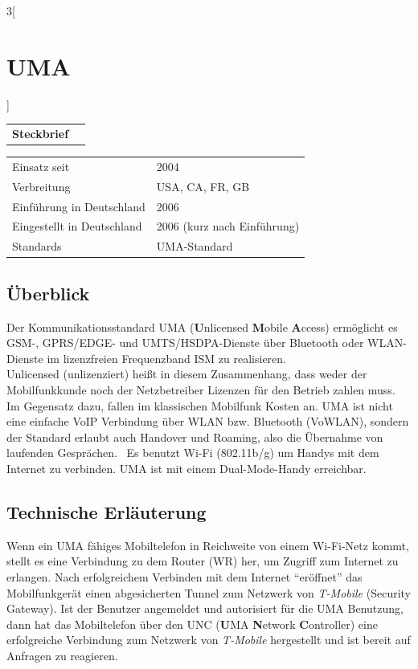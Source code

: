 \begin{multicols}{3}[\section{UMA}]


\newrefsegment

\begin{tabular}{p{}p{2.7 cm}}
\textbf{Steckbrief}& \\
\end{tabular}

\begin{tabular}{p{}p{2.7 cm}}
\rowcolors{1}{\topicolor!20}{}
      Einsatz seit & 2004\\
      Verbreitung & USA, CA, FR, GB\\
	  Einführung in Deutschland & 2006\\
      Eingestellt in Deutschland & 2006 (kurz nach Einführung)\\
	  Standards & UMA-Standard\\
\end{tabular}
\par
\subsection*{Überblick}
Der Kommunikationsstandard UMA (\textbf{U}nlicensed \textbf{M}obile \textbf{A}ccess) ermöglicht es GSM-, GPRS/EDGE- und UMTS/HSDPA-Dienste über Bluetooth oder WLAN-Dienste im lizenzfreien Frequenzband ISM zu realisieren.\\	
Unlicensed (unlizenziert) heißt in diesem Zusammenhang, dass weder der Mobilfunkkunde noch der Netzbetreiber Lizenzen für den Betrieb zahlen muss. Im Gegensatz dazu, fallen im klassischen Mobilfunk Kosten an. UMA ist nicht eine einfache VoIP Verbindung über WLAN bzw. Bluetooth (VoWLAN), sondern der Standard erlaubt auch Handover und Roaming, also die Übernahme von laufenden Gesprächen.~\cite{uma.3}
Es benutzt Wi-Fi (802.11b/g) um Handys mit dem Internet zu verbinden. UMA ist mit einem Dual-Mode-Handy erreichbar.~\cite{uma.1}

\subsection*{Technische Erläuterung}
Wenn ein UMA fähiges Mobiltelefon in Reichweite von einem Wi-Fi-Netz kommt, stellt es eine Verbindung zu dem Router (WR) her, um Zugriff zum Internet zu erlangen. Nach erfolgreichem Verbinden mit dem Internet \enquote{eröffnet} das Mobilfunkgerät einen abgesicherten Tunnel zum Netzwerk von \textit{T-Mobile} (Security Gateway). Ist der Benutzer angemeldet und autorisiert für die UMA Benutzung, dann hat das Mobiltelefon über den UNC (\textbf{U}MA \textbf{N}etwork \textbf{C}ontroller) eine erfolgreiche Verbindung zum Netzwerk von \textit{T-Mobile} hergestellt und ist bereit auf Anfragen zu reagieren.~\cite{uma.1}


\end{multicols}
